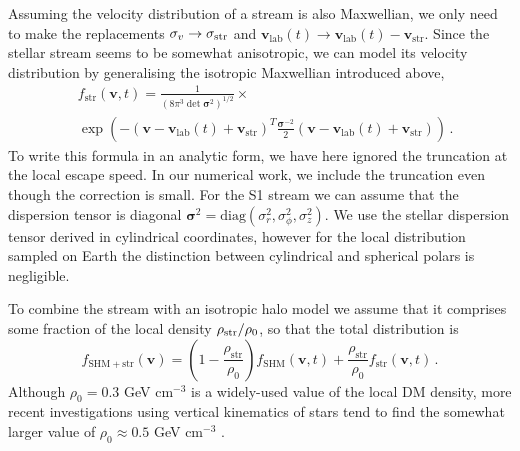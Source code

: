 \documentclass[prd,10pt,twocolumn,showpacs,nofootinbib,aps,superscriptaddress,preprintnumbers]{revtex4-1}
\newcommand{\vstr}{\mathbf{v}_\mathrm{str}}
\newcommand{\vlab}{\mathbf{v}_\mathrm{lab}}
\begin{document}
Assuming the velocity distribution of a stream is also Maxwellian, we
only need to make the replacements $\sigma_v \rightarrow \sigma_{\rm
  str}$ and $\vlab(t) \rightarrow \vlab(t) - \vstr$.  Since the
stellar stream seems to be somewhat anisotropic, we can model its
velocity distribution by generalising the isotropic Maxwellian
introduced above,
%
\begin{align}
& f_\mathrm{str}(\mathbf{v}, t) = \frac{1}{(8 \pi^3 \det{\boldsymbol{\sigma}^2})^{1/2}}  \times \\&\exp\left(-(\mathbf{v} - \vlab(t)+\vstr)^T \frac{\boldsymbol{\sigma}^{-2}}{2} (\mathbf{v} - \vlab(t)+\vstr) \right) \nonumber \, .
\end{align}
%
To write this formula in an analytic form, we have here ignored the
truncation at the local escape speed. In our numerical work, we
include the truncation even though the correction is small. For the S1
stream we can assume that the dispersion tensor is diagonal
$\boldsymbol{\sigma}^2 = \textrm{diag}(\sigma^2_r, \sigma^2_\phi,
\sigma^2_z)$. We use the stellar dispersion tensor derived in cylindrical coordinates,
 however for the local distribution sampled on Earth the distinction 
 between cylindrical and spherical polars is negligible. 

To combine the stream with an isotropic halo model we assume that it
comprises some fraction of the local density $\rho_{\rm str}/\rho_0$,
so that the total distribution is
%
\begin{equation}\label{eq:SHMStr}
 f_\mathrm{SHM+str}(\mathbf{v}) =
 \left(1-\frac{\rho_\mathrm{str}}{\rho_0}\right)f_\mathrm{SHM}(\mathbf{v},t)
 + \frac{\rho_\mathrm{str}}{\rho_0} f_\mathrm{str}(\mathbf{v},t) \, .
\end{equation}
%
Although $\rho_0=0.3$ GeV cm$^{-3}$ is a widely-used value of the
local DM density, more recent investigations using
vertical kinematics of stars tend to find the somewhat larger value of
$\rho_0 \approx 0.5$ GeV cm$^{-3}$ \cite{Smith:2012,Bienayme:2014,Sivertsson:2017rkp,Buch:2018qdr}.
\end{document}
